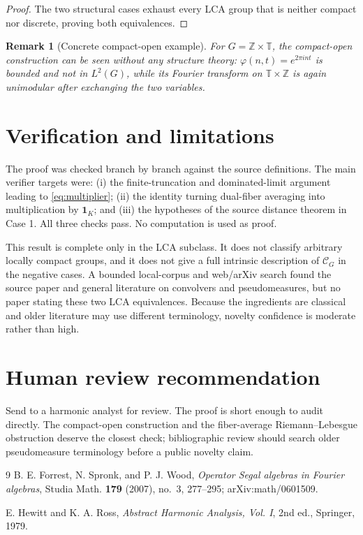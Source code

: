 \documentclass[11pt]{article}
\newtheorem{remark}{Remark}
\newcommand{\one}{\mathbf 1}
\begin{document}
\begin{proof}
The two structural cases exhaust every LCA group that is neither compact nor
discrete, proving both equivalences.
\end{proof}

\begin{remark}[Concrete compact-open example]
For $G=\mathbb Z\times\mathbb T$, the compact-open construction can be seen
without any structure theory: $\varphi(n,t)=e^{2\pi i nt}$ is bounded and not
in $L^2(G)$, while its Fourier transform on
$\mathbb T\times\mathbb Z$ is again unimodular after exchanging the two
variables.
\end{remark}

\section{Verification and limitations}

The proof was checked branch by branch against the source definitions.
The main verifier targets were: (i) the finite-truncation and dominated-limit
argument leading to \eqref{eq:multiplier}; (ii) the identity turning dual-fiber
averaging into multiplication by $\one_K$; and (iii) the hypotheses of the
source distance theorem in Case 1.  All three checks pass.  No computation is
used as proof.

This result is complete only in the LCA subclass.  It does not classify
arbitrary locally compact groups, and it does not give a full intrinsic
description of $\mathcal C_G$ in the negative cases.  A bounded local-corpus
and web/arXiv search found the source paper and general literature on
convolvers and pseudomeasures, but no paper stating these two LCA
equivalences.  Because the ingredients are classical and older literature may
use different terminology, novelty confidence is moderate rather than high.

\section{Human review recommendation}

Send to a harmonic analyst for review.  The proof is short enough to audit
directly.  The compact-open construction and the fiber-average
Riemann--Lebesgue obstruction deserve the closest check; bibliographic review
should search older pseudomeasure terminology before a public novelty claim.

\begin{thebibliography}{9}
B. E. Forrest, N. Spronk, and P. J. Wood,
\emph{Operator Segal algebras in Fourier algebras},
Studia Math. \textbf{179} (2007), no.~3, 277--295;
arXiv:math/0601509.

E. Hewitt and K. A. Ross,
\emph{Abstract Harmonic Analysis, Vol. I},
2nd ed., Springer, 1979.
\end{thebibliography}
\end{document}
